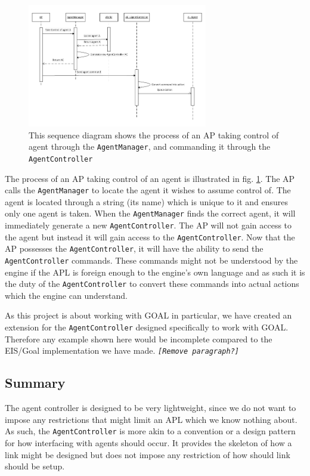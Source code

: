 \begin{figure}
\begin{centering}
\includegraphics[width=0.7\textwidth]{SystemFeatureAgentControllerSequenceDiagram}
\par\end{centering}

\caption{This sequence diagram shows the process of an AP taking control of
agent through the \texttt{AgentManager}, and commanding it through
the \texttt{AgentController\label{fig:APConnectingToAndControllingAC}}}
\end{figure}


The process of an AP taking control of an agent is illustrated in
fig. \ref{fig:APConnectingToAndControllingAC}. The AP calls the \texttt{AgentManager}
to locate the agent it wishes to assume control of. The agent is located
through a string (its name) which is unique to it and ensures only
one agent is taken. When the \texttt{AgentManager} finds the correct
agent, it will immediately generate a new \texttt{AgentController}.
The AP will not gain access to the agent but instead it will gain
access to the \texttt{AgentController}. Now that the AP possesses
the \texttt{AgentController}, it will have the ability to send the
\texttt{AgentController} commands. These commands might not be understood
by the engine if the APL is foreign enough to the engine\textquoteright{}s
own language and as such it is the duty of the \texttt{AgentController}
to convert these commands into actual actions which the engine can
understand.

As this project is about working with GOAL in particular, we have
created an extension for the \texttt{AgentController} designed specifically
to work with GOAL. Therefore any example shown here would be incomplete
compared to the EIS/Goal implementation we have made. \texttt{\emph{{[}Remove
paragraph?{]}}}


\subsection*{Summary}

The agent controller is designed to be very lightweight, since we
do not want to impose any restrictions that might limit an APL which
we know nothing about. As such, the \texttt{AgentController} is more
akin to a convention or a design pattern for how interfacing with
agents should occur. It provides the skeleton of how a link might
be designed but does not impose any restriction of how should link
should be setup.
